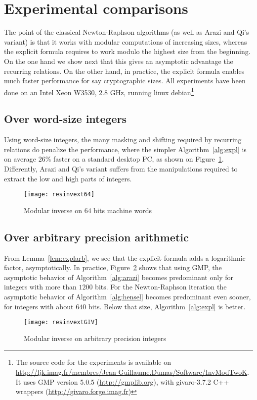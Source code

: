 \section{Experimental comparisons}
The point of the classical Newton-Raphson algorithms (as well as Arazi and Qi's
variant) is that it works with modular computations of increasing sizes, whereas
the explicit formula requires to work modulo the highest size from the
beginning. 
On the one hand we show next that this gives an asymptotic advantage the recurring relations. On the other hand, in practice, the explicit formula enables
much faster performance for say cryptographic sizes.
All experiments have been done on an Intel Xeon W3530, 2.8 GHz, running linux
debian\footnote{The source code for the experiments is available on
  \url{http://ljk.imag.fr/membres/Jean-Guillaume.Dumas/Software/InvModTwoK}. It
  uses GMP version 5.0.5 (\url{http://gmplib.org}), with givaro-3.7.2 C++
  wrappers (\url{http://givaro.forge.imag.fr})}
\subsection{Over word-size integers}
Using word-size integers, the many masking and shifting required by recurring
relations do penalize the performance, where the simpler Algorithm~\ref{alg:expl} is on average $26\%$ faster on a
standard desktop PC, as shown on Figure~\ref{fig:uint}. Differently, Arazi and
Qi's variant suffers from the manipulations required to extract the low and high
parts of integers.
\begin{figure}[htb]\center\vspace{-2pt}
\texttt{[image: resinvext64]}
\caption{Modular inverse on 64 bits machine words}\label{fig:uint}\vspace{-2pt}
\end{figure}

\subsection{Over arbitrary precision arithmetic}
From Lemma~\ref{lem:explarb}, we see that the explicit formula adds a logarithmic factor, asymptotically. 
In practice, Figure~\ref{fig:gmp} shows that using
GMP\footnotemark[1], the asymptotic behavior of Algorithm~\ref{alg:arazi} becomes predominant only for integers with more than $1200$ bits. 
For the Newton-Raphson iteration the asymptotic behavior of Algorithm~\ref{alg:hensel} becomes predominant even sooner, for integers with about $640$
 bits. 
Below that size, Algorithm~\ref{alg:expl} is better.
\begin{figure}[htb]\center\vspace{-2pt}
\texttt{[image: resinvextGIV]}
\caption{Modular inverse on arbitrary precision integers}\label{fig:gmp}\vspace{-2pt}
\end{figure}

